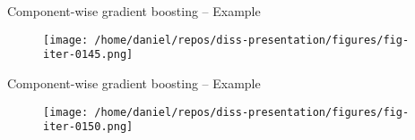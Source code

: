 \begin{frame}{Component-wise gradient boosting -- Example}
	\begin{figure}
		\centering
		\texttt{[image: /home/daniel/repos/diss-presentation/figures/fig-iter-0145.png]}
	\end{figure}
	\addtocounter{framenumber}{-1}
\end{frame}


\begin{frame}{Component-wise gradient boosting -- Example}
	\begin{figure}
		\centering
		\texttt{[image: /home/daniel/repos/diss-presentation/figures/fig-iter-0150.png]}
	\end{figure}
	\addtocounter{framenumber}{-1}
\end{frame}

